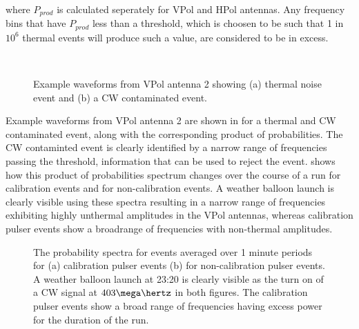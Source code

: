 \noindent where $P_{prod}$ is calculated seperately for VPol and HPol antennas. Any frequency bins that have $P_{prod}$ less than a threshold, which is choosen to be such that 1 in $10^{6}$ thermal events will produce such a value, are considered to be in excess. 


\begin{figure}[htpb]
  \hfill
  \\
  \hfill
  \caption{Example waveforms from VPol antenna 2 showing (a) thermal noise event and (b) a CW contaminated event.}
  \label{fig:analysis:CWRemoval:Baselines:Waveforms}
\end{figure}

Example waveforms from VPol antenna 2 are shown in  for a thermal and CW contaminated event, along with the corresponding product of probabilities. The CW contaminted event is clearly identified by a narrow range of frequencies passing the threshold, information that can be used to reject the event.  shows how this product of probabilities spectrum changes over the course of a run for calibration events and for non-calibration events. A weather balloon launch is clearly visible using these spectra resulting in a narrow range of frequencies exhibiting highly unthermal amplitudes in the VPol antennas, whereas calibration pulser events show a broadrange of frequencies with non-thermal amplitudes. 


\begin{figure}[htpb]
  \hfill
  \caption{The probability spectra for events averaged over 1 minute periods for (a) calibration pulser events (b) for non-calibration pulser events. A weather balloon launch at 23:20 is clearly visible as the turn on of a CW signal at $403 \mega \hertz$ in both figures. The calibration pulser events show a broad range of frequencies having excess power for the duration of the run.}
  \label{fig:analysis:CWRemoval:Filtering:CW-Time}
\end{figure}


